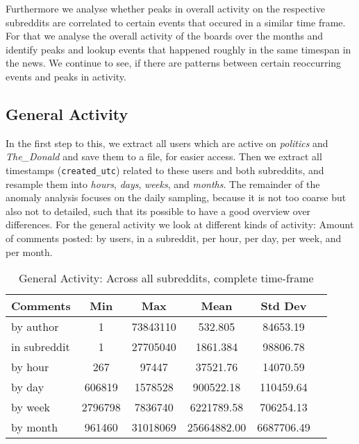 \documentclass[runningheads,a4paper]{llncs}
\newcommand{\boards}[1]{\textit{politics} #1 \textit{The\_Donald}}
\begin{document}
	Furthermore we analyse whether peaks in overall activity on the respective subreddits are correlated to certain events that occured in a similar time frame. For that we analyse the overall activity of the boards over the months and identify peaks and lookup events that happened roughly in the same timespan in the news. We continue to see, if there are patterns between certain reoccurring events and peaks in activity.
	
	\subsection{General Activity}
	In the first step to this, we extract all users which are active on \boards{and} and save them to a file, for easier access. Then we extract all timestamps (\texttt{created\_utc}) related to these users and both subreddits, and resample them into \textit{hours}, \textit{days}, \textit{weeks}, and \textit{months}. The remainder of the anomaly analysis focuses on the daily sampling, because it is not too coarse but also not to detailed, such that its possible to have a good overview over differences. For the general activity we look at different kinds of activity: Amount of comments posted: by users, in a subreddit, per hour, per day, per week, and per month.
	\begin{table}
		\caption{General Activity: Across all subreddits, complete time-frame}
		\centering
		\setlength{\tabcolsep}{5px}
		\begin{tabular}{lccccc}
			\hline\hline
			Comments  & Min & Max & Mean & Std Dev\\
			\hline
			by author & 1 & 73843110 & 532.805 & 84653.19 \\
			in subreddit & 1 & 27705040 & 1861.384 & 98806.78 \\
			by hour & 267 & 97447 & 37521.76 & 14070.59 \\
			by day & 606819 & 1578528 & 900522.18 & 110459.64 \\
			by week & 2796798 & 7836740 & 6221789.58 & 706254.13 \\
			by month & 961460 & 31018069 & 25664882.00 & 6687706.49 \\
			\hline\hline
		\end{tabular}
		\label{table:general_stats}
	\end{table}
\end{document}
